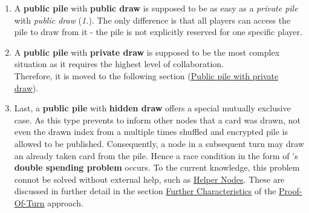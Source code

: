 \begin{enumerate}
	\item A \textbf{public pile} with \textbf{public draw} is supposed to be as easy as a \textit{private pile} with \textit{public draw} (\textit{1.}).
	The only difference is that all players can access the pile to draw from it - the pile is not explicitly reserved for one specific player.
			
	\item A \textbf{public pile} with \textbf{private draw} is supposed to be the most complex situation
	as it requires the highest level of collaboration. \\
	Therefore, it is moved to the following section (\hyperref[sec:PPwPd]{Public pile with private draw}).
	
	\item Last, a \textbf{public pile} with \textbf{hidden draw} offers a special mutually exclusive case.
	As this type prevents to inform other nodes that a card was drawn,
	not even the drawn index from a multiple times shuffled and encrypted pile is allowed to be published.
	Consequently, a node in a subsequent turn may draw an already taken card from the pile.
	Hence a race condition \cite[75]{NetzerR.H.B..1992} in the form of \citet{Nakamoto.2009}'s \textbf{double spending problem} occurs.
	To the current knowledge, this problem connot be solved without external help,
	such as \hyperref[sec:HelperNodes]{Helper Nodes}. 
	These are discussed in further detail in the section
	\hyperref[sec:FurtherCharacteristics]{Further Characteristics} of the \hyperref[chap:PoT]{Proof-Of-Turn} approach.
\end{enumerate}



